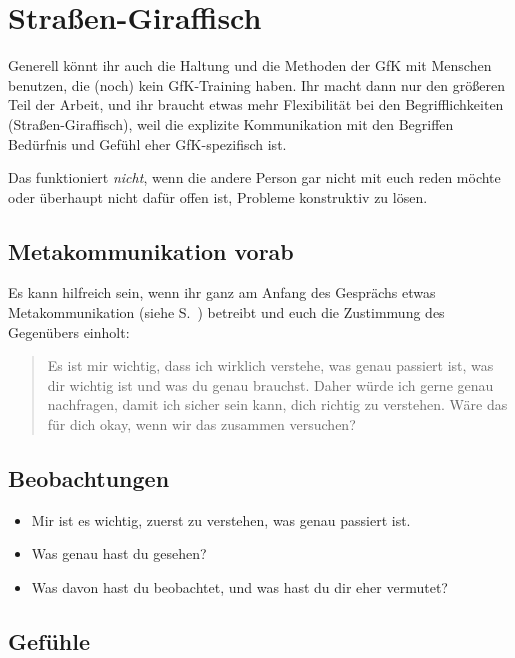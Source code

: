 \section{Straßen-Giraffisch}
\label{strassengiraffisch}

Generell könnt ihr auch die Haltung und die Methoden der GfK mit Menschen benutzen, die (noch) kein GfK-Training haben. Ihr macht dann nur den größeren Teil der Arbeit, und ihr braucht etwas mehr Flexibilität bei den Begrifflichkeiten (\glqq Straßen-Giraffisch\grqq), weil die explizite Kommunikation mit den Begriffen \glqq Bedürfnis\grqq{} und \glqq Gefühl\grqq{} eher GfK-spezifisch ist.

Das funktioniert \emph{nicht}, wenn die andere Person gar nicht mit euch reden möchte oder überhaupt nicht dafür offen ist, Probleme konstruktiv zu lösen.


\subsection{Metakommunikation vorab}

Es kann hilfreich sein, wenn ihr ganz am Anfang des Gesprächs etwas Metakommunikation (siehe S.~\pageref{metakommunikation}) betreibt und euch die Zustimmung des Gegenübers einholt:

\begin{quote}
  Es ist mir wichtig, dass ich wirklich verstehe, was genau passiert ist, was dir wichtig ist und was du genau brauchst. Daher würde ich gerne genau nachfragen, damit ich sicher sein kann, dich richtig zu verstehen. Wäre das für dich okay, wenn wir das zusammen versuchen?
\end{quote}


\subsection{Beobachtungen}

\begin{itemize}
  \item Mir ist es wichtig, zuerst zu verstehen, was genau passiert ist.
  \item Was genau hast du gesehen?
  \item Was davon hast du beobachtet, und was hast du dir eher vermutet?
\end{itemize}


\subsection{Gefühle}

